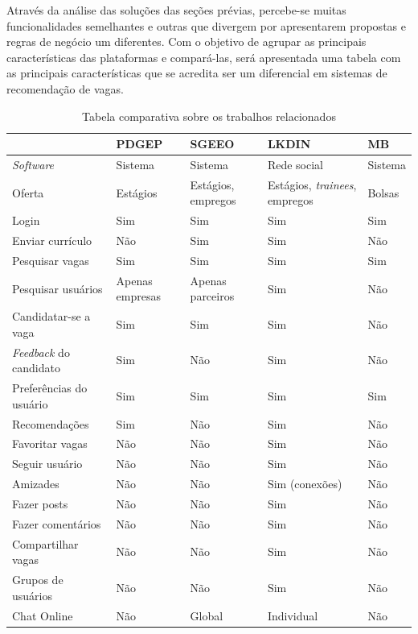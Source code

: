 \documentclass[cic,tc]{iiufrgs}
\begin{document}
Através da análise das soluções das seções prévias, percebe-se muitas funcionalidades semelhantes e outras que divergem por apresentarem propostas e regras de negócio um diferentes. Com o objetivo de agrupar as principais características das plataformas e compará-las, será apresentada uma tabela com as principais características que se acredita ser um diferencial em sistemas de recomendação de vagas. 

\begin{table}[h]
    \begin{adjustwidth}{-0.7in}{-0.7in}
    \begin{center}
    \caption{Tabela comparativa sobre os trabalhos relacionados}
    \begin{tabular}{lllll}
    \hline
                        & PDGEP           & SGEEO             & LKDIN         & MB \\
    \hline
    \textit{Software}   & Sistema         & Sistema           & Rede social   & Sistema \\
    Oferta              & Estágios        & Estágios, empregos &Estágios, \textit{trainees}, empregos & Bolsas \\
    Login               & Sim             & Sim               & Sim           & Sim \\
    Enviar currículo    & Não             & Sim               & Sim           & Não \\
    Pesquisar vagas     & Sim             & Sim               & Sim           & Sim \\
    Pesquisar usuários  & Apenas empresas & Apenas parceiros  & Sim           & Não \\
    Candidatar-se a vaga& Sim             & Sim               & Sim           & Não \\
    \textit{Feedback} do candidato & Sim  & Não               & Sim           & Não \\
    Preferências do usuário & Sim         & Sim               & Sim           & Sim \\
    Recomendações       & Sim             & Não               & Sim           & Não \\
    Favoritar vagas     & Não             & Não               & Sim           & Não \\
    Seguir usuário      & Não             & Não               & Sim           & Não \\
    Amizades            & Não             & Não               & Sim (conexões) & Não \\
    Fazer posts         & Não             & Não               & Sim           & Não \\
    Fazer comentários   & Não             & Não               & Sim           & Não \\
    Compartilhar vagas  & Não             & Não               & Sim           & Não \\
    Grupos de usuários  & Não             & Não               & Sim           & Não \\
    Chat Online         & Não             & Global            & Individual    & Não \\
    \hline
    

\end{tabular}
\end{center}
\end{adjustwidth}
\end{table}
\end{document}
